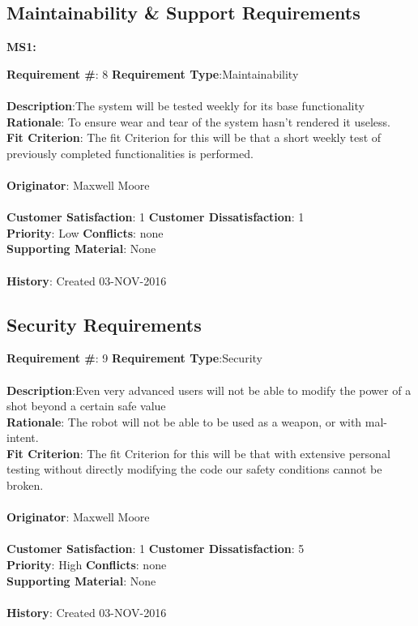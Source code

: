 \documentclass[titlepage]{article}
\begin{document}
 \subsection{Maintainability \& Support Requirements}
 \textbf{MS1:} %

\begin{framed}
	\noindent\textbf{Requirement \#}: 8 \hfill \textbf{Requirement Type}:Maintainability \hfill\\\\
	\noindent\textbf{Description}:The system will be tested weekly for its base functionality\\
	\textbf{Rationale}: To ensure wear and tear of the system hasn't rendered it useless.\\
	\textbf{Fit Criterion}: The fit Criterion for this will be that a short weekly test of previously completed functionalities is performed.\\\\
	\textbf{Originator}: Maxwell Moore\\\\
	\noindent\textbf{Customer Satisfaction}: 1 \hfill 	\textbf{Customer Dissatisfaction}: 1 \hfill\\
	\textbf{Priority}: Low \hfill \textbf{Conflicts}: none \hfill\\
	\textbf{Supporting Material}: None\\\\
	\noindent\textbf{History}: Created 03-NOV-2016
\end{framed}


 
 \subsection{Security Requirements}

\begin{framed}
	\noindent\textbf{Requirement \#}: 9 \hfill \textbf{Requirement Type}:Security \hfill\\\\
	\noindent\textbf{Description}:Even very advanced users will not be able to modify the power of a shot beyond a certain safe value\\
	\textbf{Rationale}: The robot will not be able to be used as a weapon, or with mal-intent.\\
	\textbf{Fit Criterion}: The fit Criterion for this will be that with extensive personal testing without directly modifying the code our safety conditions cannot be broken.\\\\
	\textbf{Originator}: Maxwell Moore\\\\
	\noindent\textbf{Customer Satisfaction}: 1 \hfill 	\textbf{Customer Dissatisfaction}: 5 \hfill\\
	\textbf{Priority}: High \hfill \textbf{Conflicts}: none \hfill\\
	\textbf{Supporting Material}: None\\\\
	\noindent\textbf{History}: Created 03-NOV-2016
\end{framed}
 
\end{document}

